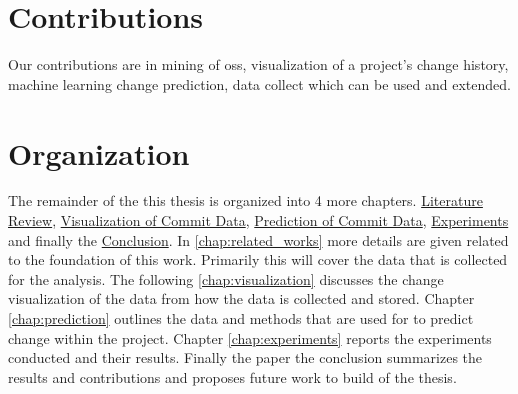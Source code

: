 \section{Contributions}


Our contributions are in mining of \gls{oss}, visualization of a project's change history, machine learning change prediction, data collect which can be used and extended.

\section{Organization}

The remainder of the this thesis is organized into 4 more chapters. \hyperref[chap:related_works]{Literature Review}, \hyperref[chap:visualization]{Visualization of Commit Data}, \hyperref[chap:prediction]{Prediction of Commit Data}, \hyperref[chap:experiments]{Experiments} and finally the \hyperref[chap:conclusions]{Conclusion}. In \autoref{chap:related_works} more details are given related to the foundation of this work. Primarily this will cover the data that is collected for the analysis. The following \autoref{chap:visualization} discusses the change visualization of the data from how the data is collected and stored. Chapter \autoref{chap:prediction} outlines the data and methods that are used for to predict change within the project. Chapter \ref{chap:experiments} reports the experiments conducted and their results. Finally the paper the conclusion summarizes the results and contributions and proposes future work to build of the thesis.
